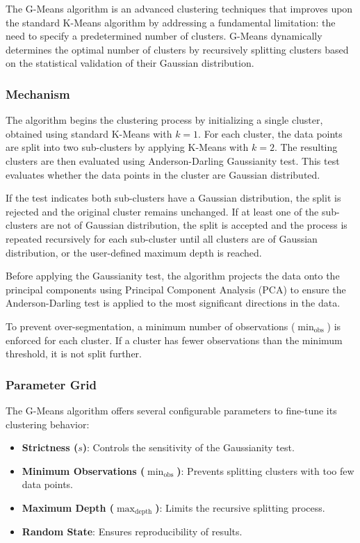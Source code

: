The G-Means algorithm is an advanced clustering techniques that improves upon the standard K-Means algorithm by addressing
a fundamental limitation: the need to specify a predetermined number of clusters.
G-Means dynamically determines the optimal number of clusters by recursively splitting clusters based on the
statistical validation of their Gaussian distribution. \cite{gmeans}

\subsubsection*{Mechanism}

The algorithm begins the clustering process by initializing a single cluster, obtained using standard K-Means with \(k=1\).
For each cluster, the data points are split into two sub-clusters by applying K-Means with \(k=2\).
The resulting clusters are then evaluated using Anderson-Darling Gaussianity test. This test evaluates whether the data points in the cluster
are Gaussian distributed. \cite{gmeans}

If the test indicates both sub-clusters have a Gaussian distribution, the split is rejected and the original cluster remains unchanged.
If at least one of the sub-clusters are not of Gaussian distribution, the split is accepted and the process is repeated recursively for each sub-cluster
until all clusters are of Gaussian distribution, or the user-defined maximum depth is reached. \cite{gmeans}

Before applying the Gaussianity test, the algorithm projects the data onto the principal components using Principal Component
Analysis (PCA) to ensure the Anderson-Darling test is applied to the most significant directions in the data.

To prevent over-segmentation, a minimum number of observations (\(\min_{\text{obs}}\)) is enforced for each cluster.
If a cluster has fewer observations than the minimum threshold, it is not split further.

\subsubsection*{Parameter Grid}

The G-Means algorithm offers several configurable parameters to fine-tune its clustering behavior:

\begin{itemize}
    \item \textbf{Strictness ($s$)}: Controls the sensitivity of the Gaussianity test.
    \item \textbf{Minimum Observations ($\min_{\text{obs}}$)}: Prevents splitting clusters with too few data points.
    \item \textbf{Maximum Depth ($\max_{\text{depth}}$)}: Limits the recursive splitting process.
    \item \textbf{Random State}: Ensures reproducibility of results.
\end{itemize}

